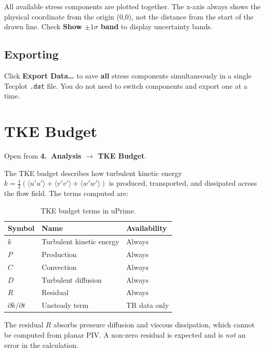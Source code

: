 \documentclass[11pt, a4paper]{report}
\newcommand{\uipth}[1]{\textbf{\textcolor{upblue}{#1}}}
\begin{document}
All available stress components are plotted together. The x-axis always shows the physical coordinate from the origin (0,0), not the distance from the start of the drawn line. Check \uipth{Show $\pm1\sigma$ band} to display uncertainty bands.

\section{Exporting}

Click \uipth{Export Data\ldots} to save \textbf{all} stress components simultaneously in a single Tecplot \texttt{.dat} file. You do not need to switch components and export one at a time.

\chapter{TKE Budget}
\label{ch:tke}

Open from \uipth{4.\ Analysis $\to$ TKE Budget}.

The TKE budget describes how turbulent kinetic energy $k = \tfrac{1}{2}(\langle u'u'\rangle + \langle v'v'\rangle + \langle w'w'\rangle)$ is produced, transported, and dissipated across the flow field. The terms computed are:

\begin{table}[htbp]
\centering
\caption{TKE budget terms in uPrime.}
\begin{tabular}{lll}
\toprule
\textbf{Symbol} & \textbf{Name} & \textbf{Availability} \\
\midrule
$k$                     & Turbulent kinetic energy  & Always \\
$P$                     & Production                & Always \\
$C$                     & Convection                & Always \\
$D$                     & Turbulent diffusion       & Always \\
$R$                     & Residual                  & Always \\
$\partial k/\partial t$ & Unsteady term             & TR data only \\
\bottomrule
\end{tabular}
\end{table}

\begin{notebox}
The residual $R$ absorbs pressure diffusion and viscous dissipation, which cannot be computed from planar PIV. A non-zero residual is expected and is \emph{not} an error in the calculation.
\end{notebox}
\end{document}

